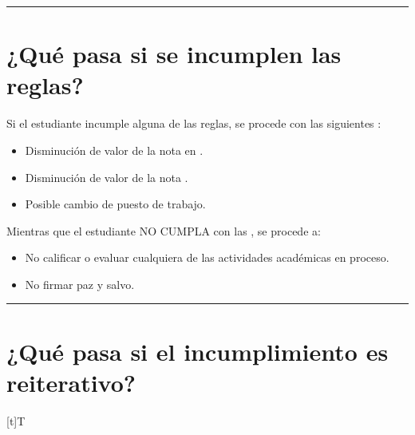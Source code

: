 \documentclass[letterpaper,10pt,spanish]{sphinxmanual}
\let\sphinxpxdimen\pdfpxdimen\else\newdimen\sphinxpxdimen
\begin{document}
\bigskip\hrule\bigskip



\section{¿Qué pasa si se incumplen las reglas?}
\label{\detokenize{reglas:que-pasa-si-se-incumplen-las-reglas}}
\sphinxAtStartPar
Si el estudiante incumple alguna de las reglas, se procede con las siguientes :
\begin{itemize}
\item {} 
\sphinxAtStartPar
Disminución de valor de la nota en .

\item {} 
\sphinxAtStartPar
Disminución de valor de la nota .

\item {} 
\sphinxAtStartPar
Posible cambio de puesto de trabajo.

\end{itemize}

\sphinxAtStartPar
Mientras que el estudiante NO CUMPLA con las , se procede a:
\begin{itemize}
\item {} 
\sphinxAtStartPar
No calificar o evaluar cualquiera de las actividades académicas en proceso.

\item {} 
\sphinxAtStartPar
No firmar paz y salvo.

\end{itemize}


\bigskip\hrule\bigskip



\section{¿Qué pasa si el incumplimiento es reiterativo?}
\label{\detokenize{reglas:que-pasa-si-el-incumplimiento-es-reiterativo}}

\begin{savenotes}\sphinxattablestart
\sphinxthistablewithglobalstyle
\centering
\begin{tabulary}{\linewidth}[t]{T}
\sphinxtoprule
\sphinxtableatstartofbodyhook

\begin{sphinxfigure-in-table}
\centering
\capstart
\noindent\sphinxincludegraphics[width=300\sphinxpxdimen]{{image026}.png}
\label{\detokenize{reglas:id1}}\end{sphinxfigure-in-table}\relax
\\
\sphinxbottomrule
\end{tabulary}
\sphinxtableafterendhook\par
\sphinxattableend\end{savenotes}
\end{document}
